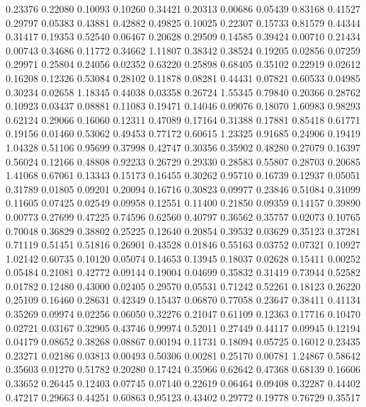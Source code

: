   0.23376 0.22080
  0.10093 0.10260
  0.34421 0.20313
  0.00686 0.05439
  0.83168 0.41527
  0.29797 0.05383
  0.43881 0.42882
  0.49825 0.10025
  0.22307 0.15733
  0.81579 0.44344
  0.31417 0.19353
  0.52540 0.06467
  0.20628 0.29509
  0.14585 0.39424
  0.00710 0.21434
  0.00743 0.34686
  0.11772 0.34662
  1.11807 0.38342
  0.38524 0.19205
  0.02856 0.07259
  0.29971 0.25804
  0.24056 0.02352
  0.63220 0.25898
  0.68405 0.35102
  0.22919 0.02612
  0.16208 0.12326
  0.53084 0.28102
  0.11878 0.08281
  0.44431 0.07821
  0.60533 0.04985
  0.30234 0.02658
  1.18345 0.44038
  0.03358 0.26724
  1.55345 0.79840
  0.20366 0.28762
  0.10923 0.03437
  0.08881 0.11083
  0.19471 0.14046
  0.09076 0.18070
  1.60983 0.98293
  0.62124 0.29066
  0.16060 0.12311
  0.47089 0.17164
  0.31388 0.17881
  0.85418 0.61771
  0.19156 0.01460
  0.53062 0.49453
  0.77172 0.60615
  1.23325 0.91685
  0.24906 0.19419
  1.04328 0.51106
  0.95699 0.37998
  0.42747 0.30356
  0.35902 0.48280
  0.27079 0.16397
  0.56024 0.12166
  0.48808 0.92233
  0.26729 0.29330
  0.28583 0.55807
  0.28703 0.20685
  1.41068 0.67061
  0.13343 0.15173
  0.16455 0.30262
  0.95710 0.16739
  0.12937 0.05051
  0.31789 0.01805
  0.09201 0.20094
  0.16716 0.30823
  0.09977 0.23846
  0.51084 0.31099
  0.11605 0.07425
  0.02549 0.09958
  0.12551 0.11400
  0.21850 0.09359
  0.14157 0.39890
  0.00773 0.27699
  0.47225 0.74596
  0.62560 0.40797
  0.36562 0.35757
  0.02073 0.10765
  0.70048 0.36829
  0.38802 0.25225
  0.12640 0.20854
  0.39532 0.03629
  0.35123 0.37281
  0.71119 0.51451
  0.51816 0.26901
  0.43528 0.01846
  0.55163 0.03752
  0.07321 0.10927
  1.02142 0.60735
  0.10120 0.05074
  0.14653 0.13945
  0.18037 0.02628
  0.15411 0.00252
  0.05484 0.21081
  0.42772 0.09144
  0.19004 0.04699
  0.35832 0.31419
  0.73944 0.52582
  0.01782 0.12480
  0.43000 0.02405
  0.29570 0.05531
  0.71242 0.52261
  0.18123 0.26220
  0.25109 0.16460
  0.28631 0.42349
  0.15437 0.06870
  0.77058 0.23647
  0.38411 0.41134
  0.35269 0.09974
  0.02256 0.06050
  0.32276 0.21047
  0.61109 0.12363
  0.17716 0.10470
  0.02721 0.03167
  0.32905 0.43746
  0.99974 0.52011
  0.27449 0.44117
  0.09945 0.12194
  0.04179 0.08652
  0.38268 0.08867
  0.00194 0.11731
  0.18094 0.05725
  0.16012 0.23435
  0.23271 0.02186
  0.03813 0.00493
  0.50306 0.00281
  0.25170 0.00781
  1.24867 0.58642
  0.35603 0.01270
  0.51782 0.20280
  0.17424 0.35966
  0.62642 0.47368
  0.68139 0.16606
  0.33652 0.26445
  0.12403 0.07745
  0.07140 0.22619
  0.06464 0.09408
  0.32287 0.44402
  0.47217 0.29663
  0.44251 0.60863
  0.95123 0.43402
  0.29772 0.19778
  0.76729 0.35517
